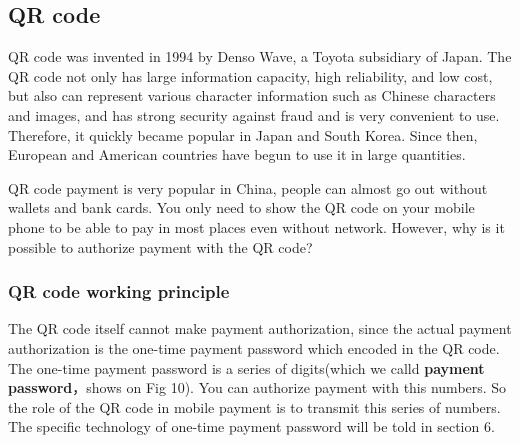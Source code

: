 \documentclass[journal]{IEEEtran}
\begin{document}
\subsection{QR code}
QR code was invented in 1994 by Denso Wave, a Toyota subsidiary of Japan. The QR code not only has large information capacity, high reliability, and low cost, but also can represent various character information such as Chinese characters and images, and has strong security against fraud and is very convenient to use. Therefore, it quickly became popular in Japan and South Korea. Since then, European and American countries have begun to use it in large quantities. 

QR code payment is very popular in China, people can almost go out without wallets and bank cards. You only need to show the QR code on your mobile phone to be able to pay in most places even without network. However, why is it possible to authorize payment with the QR code?



\subsubsection{QR code working principle}

The QR code itself cannot make payment authorization, since the actual payment authorization is the one-time payment password which encoded in the QR code. The one-time payment password is a series of digits(which we calld \textbf{payment password}，shows on Fig 10). You can authorize payment with this numbers. So the role of the QR code in mobile payment is to transmit this series of numbers. The specific technology of one-time payment password will be told in section 6.
\end{document}

